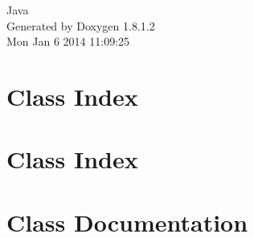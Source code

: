 \documentclass{book}
\begin{document}
\hypersetup{pageanchor=false,citecolor=blue}
\begin{titlepage}
\vspace*{7cm}
\begin{center}
{\Large Java }\\
\vspace*{1cm}
{\large Generated by Doxygen 1.8.1.2}\\
\vspace*{0.5cm}
{\small Mon Jan 6 2014 11:09:25}\\
\end{center}
\end{titlepage}
\clearemptydoublepage
{}
\tableofcontents
\clearemptydoublepage
{}
\hypersetup{pageanchor=true,citecolor=blue}
\chapter{Class Index}

\chapter{Class Index}

\chapter{Class Documentation}


















\printindex
\end{document}
